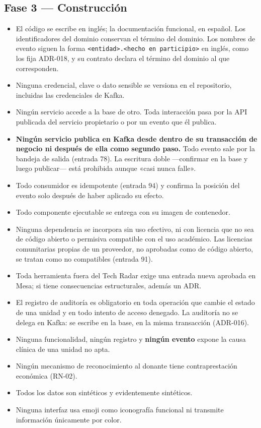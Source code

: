 \documentclass[11pt,a4paper]{article}
\begin{document}
\subsection{Fase 3 — Construcción}

\begin{itemize}
\item El código se escribe en inglés; la documentación funcional, en español. Los identificadores del dominio conservan el término del dominio. Los nombres de evento siguen la forma \texttt{<entidad>.<hecho en participio>} en inglés, como los fija ADR-018, y su contrato declara el término del dominio al que corresponden.
\item Ninguna credencial, clave o dato sensible se versiona en el repositorio, incluidas las credenciales de Kafka.
\item Ningún servicio accede a la base de otro. Toda interacción pasa por la API publicada del servicio propietario o por un evento que él publica.
\item \textbf{Ningún servicio publica en Kafka desde dentro de su transacción de negocio ni después de ella como segundo paso.} Todo evento sale por la bandeja de salida (entrada 78). La escritura doble ---confirmar en la base y luego publicar--- está prohibida aunque «casi nunca falle».
\item Todo consumidor es idempotente (entrada 94) y confirma la posición del evento solo después de haber aplicado su efecto.
\item Todo componente ejecutable se entrega con su imagen de contenedor.
\item Ninguna dependencia se incorpora sin uso efectivo, ni con licencia que no sea de código abierto o permisiva compatible con el uso académico. Las licencias comunitarias propias de un proveedor, no aprobadas como de código abierto, se tratan como no compatibles (entrada 91).
\item Toda herramienta fuera del Tech Radar exige una entrada nueva aprobada en Mesa; si tiene consecuencias estructurales, además un ADR.
\item El registro de auditoría es obligatorio en toda operación que cambie el estado de una unidad y en todo intento de acceso denegado. La auditoría no se delega en Kafka: se escribe en la base, en la misma transacción (ADR-016).
\item Ninguna funcionalidad, ningún registro y \textbf{ningún evento} expone la causa clínica de una unidad no apta.
\item Ningún mecanismo de reconocimiento al donante tiene contraprestación económica (RN-02).
\item Todos los datos son sintéticos y evidentemente sintéticos.
\item Ninguna interfaz usa emoji como iconografía funcional ni transmite información únicamente por color.
\end{itemize}
\end{document}
